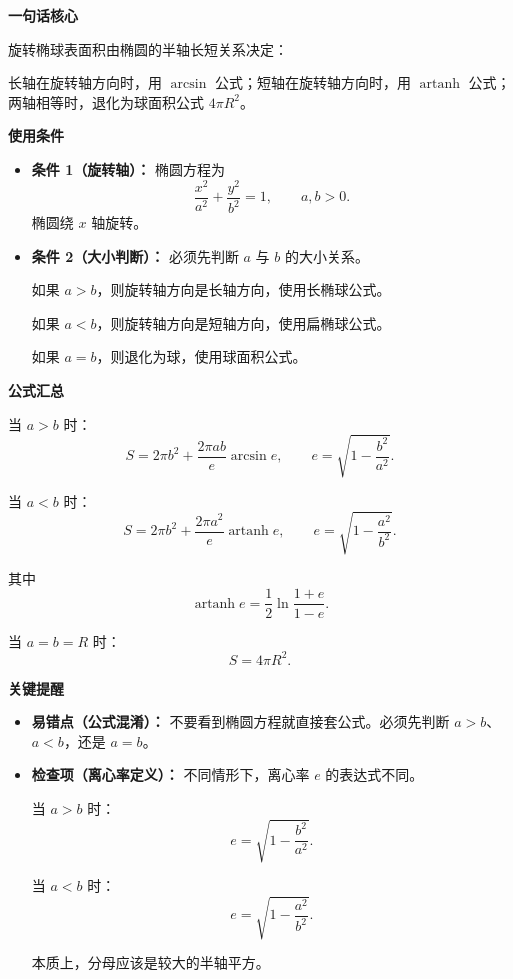 \begin{summarybox}

	\textbf{\textcolor{CSummary}{一句话核心}}

	旋转椭球表面积由椭圆的半轴长短关系决定：

	长轴在旋转轴方向时，用 $\arcsin$ 公式；短轴在旋转轴方向时，用 $\operatorname{artanh}$ 公式；两轴相等时，退化为球面积公式 $4\pi R^{2}$。

	\medskip

	\textbf{\textcolor{CSummary}{使用条件}}

	\begin{itemize}[leftmargin=*, itemsep=0.5em, topsep=0.4em]

		\item \textbf{条件 1（旋转轴）：}
		      椭圆方程为
		      \[
			      \frac{x^{2}}{a^{2}}+\frac{y^{2}}{b^{2}}=1,
			      \qquad a,b>0.
		      \]
		      椭圆绕 $x$ 轴旋转。

		\item \textbf{条件 2（大小判断）：}
		      必须先判断 $a$ 与 $b$ 的大小关系。

		      如果 $a>b$，则旋转轴方向是长轴方向，使用长椭球公式。

		      如果 $a<b$，则旋转轴方向是短轴方向，使用扁椭球公式。

		      如果 $a=b$，则退化为球，使用球面积公式。

	\end{itemize}

	\medskip

	\textbf{\textcolor{CSummary}{公式汇总}}

	当 $a>b$ 时：
	\[
		S
		=
		2\pi b^{2}
		+
		\frac{2\pi ab}{e}\arcsin e,
		\qquad
		e=\sqrt{1-\frac{b^{2}}{a^{2}}}.
	\]

	当 $a<b$ 时：
	\[
		S
		=
		2\pi b^{2}
		+
		\frac{2\pi a^{2}}{e}\operatorname{artanh}e,
		\qquad
		e=\sqrt{1-\frac{a^{2}}{b^{2}}}.
	\]

	其中
	\[
		\operatorname{artanh}e
		=
		\frac12\ln\frac{1+e}{1-e}.
	\]

	当 $a=b=R$ 时：
	\[
		S=4\pi R^{2}.
	\]

	\medskip

	\textbf{\textcolor{CSummary}{关键提醒}}

	\begin{itemize}[leftmargin=*, itemsep=0.5em, topsep=0.4em]

		\item \textbf{易错点（公式混淆）：}
		      不要看到椭圆方程就直接套公式。必须先判断 $a>b$、$a<b$，还是 $a=b$。

		\item \textbf{检查项（离心率定义）：}
		      不同情形下，离心率 $e$ 的表达式不同。

		      当 $a>b$ 时：
		      \[
			      e=\sqrt{1-\frac{b^{2}}{a^{2}}}.
		      \]

		      当 $a<b$ 时：
		      \[
			      e=\sqrt{1-\frac{a^{2}}{b^{2}}}.
		      \]

		      本质上，分母应该是较大的半轴平方。

	\end{itemize}

\end{summarybox}